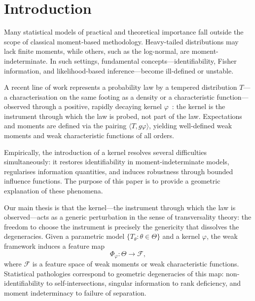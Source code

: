 \documentclass[11pt,a4paper]{article}
\newcommand{\Fseven} {\fontsize{7}{11}\selectfont  }
\begin{document}
\begin{abstract}
This paper serves as a geometric companion to a series of papers
developing the distributional statistical
framework, providing the transversality-theoretic
foundation that unifies their separate contributions.

\medskip
\noindent
\textbf{Keywords:} distributional statistical models, transversality,
kernel regularisation, identifiability, moment indeterminacy,
information geometry, inferential separation, Behrens--Fisher problem.

\medskip
\noindent
\textbf{MSC 2020:} 62B05, 62F35, 57R45, 46F05, 53B12.
\end{abstract}

\newpage
{}
\Fseven
\tableofcontents
\newpage
\normalsize
{}



\section{Introduction}
\label{sec:intro}
Many statistical models of practical and theoretical importance fall outside the
scope of classical moment-based methodology. Heavy-tailed distributions may lack
finite moments, while others, such as the log-normal, are moment-indeterminate.
In such settings, fundamental concepts—identifiability, Fisher information, and
likelihood-based inference—become ill-defined or unstable.

A recent line of work represents a probability law by a tempered
distribution $T$---a characterisation on the same footing as a density or a
characteristic function---observed through a positive, rapidly decaying
kernel $\varphi$~\cite{A}: the kernel is the instrument through which the law
is probed, not part of the law. Expectations and moments are defined
via the pairing $\langle T, g\varphi\rangle$, yielding well-defined weak moments
and weak characteristic functions of all orders.

Empirically, the introduction of a kernel resolves several difficulties
simultaneously: it restores identifiability in moment-indeterminate models,
regularises information quantities, and induces robustness through bounded
influence functions. The purpose of this paper is to provide a geometric
explanation of these phenomena.

Our main thesis is that the kernel---the instrument through which the law is
observed---acts as a generic perturbation in the sense of transversality
theory: the freedom to choose the instrument is precisely the genericity that
dissolves the degeneracies. Given a parametric model $\{T_\theta: \theta\in\Theta\}$ and a kernel
$\varphi$, the weak framework induces a feature map
\[
\Phi_\varphi : \Theta \to \mathcal F,
\]
where $\mathcal F$ is a feature space of weak moments or weak characteristic
functions. Statistical pathologies correspond to geometric degeneracies of this
map: non-identifiability to self-intersections, singular information to rank
deficiency, and moment indeterminacy to failure of separation.
\end{document}
